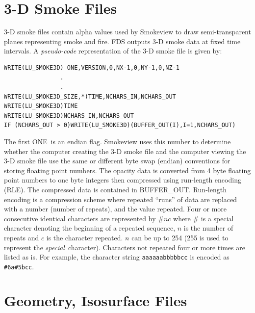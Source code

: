 \documentclass[11pt]{book}
\begin{document}
\section{3-D Smoke Files}
\label{out:SMOKE3D}

3-D smoke files contain alpha values used by Smokeview to draw semi-transparent planes representing smoke and fire. FDS outputs 3-D smoke data at fixed time intervals.  A {\em pseudo-code} representation of the 3-D smoke file is given by:
\begin{lstlisting}
WRITE(LU_SMOKE3D) ONE,VERSION,0,NX-1,0,NY-1,0,NZ-1
                .
                .
WRITE(LU_SMOKE3D_SIZE,*)TIME,NCHARS_IN,NCHARS_OUT
WRITE(LU_SMOKE3D)TIME
WRITE(LU_SMOKE3D)NCHARS_IN,NCHARS_OUT
IF (NCHARS_OUT > 0)WRITE(LU_SMOKE3D)(BUFFER_OUT(I),I=1,NCHARS_OUT)
\end{lstlisting}
The first {\ct ONE}\ is an endian flag.  Smokeview uses this number to determine whether the computer creating the 3-D smoke file and the computer viewing the 3-D smoke file use the same or different byte swap (endian) conventions for storing floating point numbers.  The opacity data is converted from 4 byte floating point numbers to one byte integers then compressed using
run-length encoding (RLE). The compressed data is contained in {\ct BUFFER\_OUT}.  Run-length encoding is a compression scheme where repeated ``runs'' of data are replaced with a number (number of repeats), and the value repeated. Four or more consecutive identical characters are represented by $\# n c$ where $\#$ is a special character denoting the beginning of a repeated sequence, $n$ is the number of repeats and $c$ is the character repeated.  $n$ can be up to 254 (255 is used to represent the {\em special}\ character). Characters not repeated four or more times are listed as is. For example, the character string {\tt aaaaaabbbbbcc} is encoded as {\tt \#6a\#5bcc}.



\section{Geometry, Isosurface Files}
\label{out:GEOMETRY}
\end{document}
